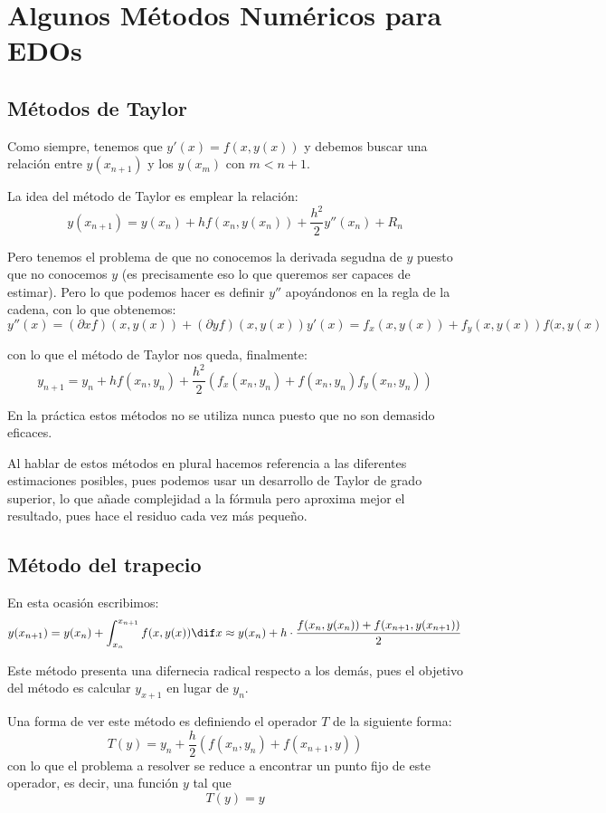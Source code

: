 
\chapter{Algunos Métodos Numéricos para EDOs}


\section{Métodos de Taylor}
Como siempre, tenemos que $y'(x)=f(x,y(x))$ y debemos buscar una relación entre $y(x_{n+1})$ y los $y(x_m)$ con $m < n+1$.

La idea del método de Taylor es emplear la relación:
\[y(x_{n+1})=y(x_n)+hf(x_n,y(x_n))+\frac{h^2}{2}y''(x_n)+R_n\]

Pero tenemos el problema de que no conocemos la derivada segudna de $y$ puesto que no conocemos $y$ (es precisamente eso lo que queremos ser capaces de estimar). Pero lo que podemos hacer es definir $y''$ apoyándonos en la regla de la cadena, con lo que obtenemos:
\[y''(x)=(\partial x f)(x,y(x))+(\partial y f)(x,y(x))y'(x)=f_x(x,y(x))+f_y(x,y(x))f(x,y(x)\]

con lo que el método de Taylor nos queda, finalmente:
\[y_{n+1} = y_n + hf(x_n,y_n)+\frac{h^2}{2}\left(f_x(x_n,y_n)+f(x_n, y_n)f_y(x_n,y_n)\right)\]

\begin{remark}
En la práctica estos métodos no se utiliza nunca puesto que no son demasido eficaces.
\end{remark}

Al hablar de estos métodos en plural hacemos referencia a las diferentes estimaciones posibles, pues podemos usar un desarrollo de Taylor de grado superior, lo que añade complejidad a la fórmula pero aproxima mejor el resultado, pues hace el residuo cada vez más pequeño.


\section{Método del trapecio}
En esta ocasión escribimos:
\[y(x_{n+1})=y(x_n) + \int_{x_n}^{x_{n+1}} f(x,y(x))\dif x \approx y(x_n)+ h\cdot \frac{f(x_n,y(x_n))+f(x_{n+1},y(x_{n+1}))}{2}  \]

Este método presenta una difernecia radical respecto a los demás, pues el objetivo del método es calcular $y_{x+1}$ en lugar de $y_n$.

Una forma de ver este método es definiendo el operador $T$ de la siguiente forma:
\[T(y) = y_n + \frac{h}{2} \left(f(x_n,y_n)+f(x_{n+1}, y) \right)\]
con lo que el problema a resolver se reduce a encontrar un punto fijo de este operador, es decir, una función $y$ tal que
\[T(y)=y\]

